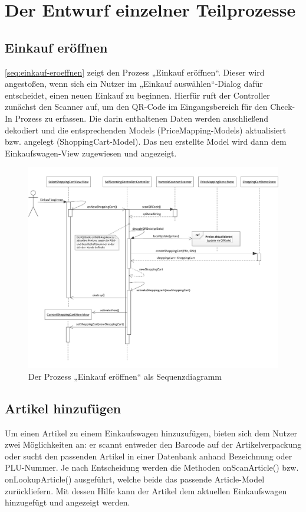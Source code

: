 \section{Der Entwurf einzelner Teilprozesse}
\subsection{Einkauf eröffnen}
\vref*{seq:einkauf-eroeffnen} zeigt den Prozess „Einkauf eröffnen“. Dieser wird angestoßen, wenn sich ein Nutzer im „Einkauf auswählen“-Dialog dafür entscheidet, einen neuen Einkauf zu beginnen. Hierfür ruft der Controller zunächst den Scanner auf, um den QR-Code im Eingangsbereich für den Check-In Prozess zu erfassen. Die darin enthaltenen Daten werden anschließend dekodiert und die entsprechenden Models (PriceMapping-Models) aktualisiert bzw. angelegt (ShoppingCart-Model). Das neu erstellte Model wird dann dem Einkaufswagen-View zugewiesen und angezeigt.

\begin{figure}[H]
\includegraphics[width=\linewidth]{res/seq_einkauf-eroeffnen.pdf}
\caption{Der Prozess „Einkauf eröffnen“ als Sequenzdiagramm}\label{seq:einkauf-eroeffnen}
\end{figure}

\subsection{Artikel hinzufügen}
Um einen Artikel zu einem Einkaufswagen hinzuzufügen, bieten sich dem Nutzer zwei Möglichkeiten an: er scannt entweder den Barcode auf der Artikelverpackung oder sucht den passenden Artikel in einer Datenbank anhand Bezeichnung oder PLU-Nummer. Je nach Entscheidung werden die Methoden onScanArticle() bzw. onLookupArticle() ausgeführt, welche beide das passende Article-Model zurückliefern. Mit dessen Hilfe kann der Artikel dem aktuellen Einkaufswagen hinzugefügt und angezeigt werden.

